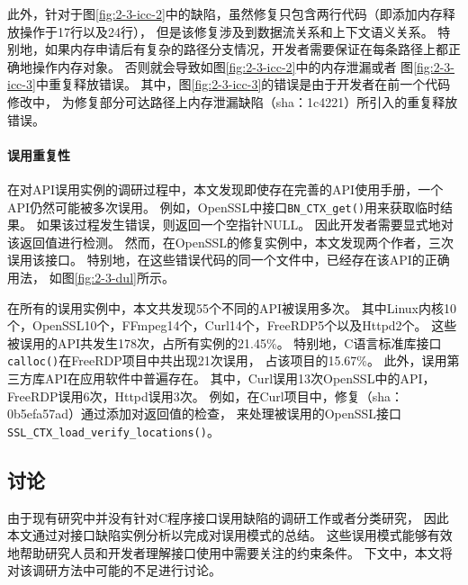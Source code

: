 此外，针对于图\ref{fig:2-3-icc-2}中的缺陷，虽然修复只包含两行代码（即添加内存释放操作于17行以及24行），
但是该修复涉及到数据流关系和上下文语义关系。
特别地，如果内存申请后有复杂的路径分支情况，开发者需要保证在每条路径上都正确地操作内存对象。
否则就会导致如图\ref{fig:2-3-icc-2}中的内存泄漏或者
图\ref{fig:2-3-icc-3}中重复释放错误。
其中，图\ref{fig:2-3-icc-3}的错误是由于开发者在前一个代码修改中，
为修复部分可达路径上内存泄漏缺陷（sha：1c4221）所引入的重复释放错误。

\vspace*{10pt}
\begin{center}
	\noindent{}
\end{center}



\paragraph{误用重复性}
在对API误用实例的调研过程中，本文发现即使存在完善的API使用手册，一个API仍然可能被多次误用。
例如，OpenSSL中接口\texttt{BN\_CTX\_get()}用来获取临时结果。
如果该过程发生错误，则返回一个空指针NULL。
因此开发者需要显式地对该返回值进行检测。
然而，在OpenSSL的修复实例中，本文发现两个作者，三次误用该接口。
特别地，在这些错误代码的同一个文件中，已经存在该API的正确用法，
如图\ref{fig:2-3-dul}所示。

在所有的误用实例中，本文共发现55个不同的API被误用多次。
其中Linux内核10个，OpenSSL10个，FFmpeg14个，Curl14个，FreeRDP5个以及Httpd2个。
这些被误用的API共发生178次，占所有实例的21.45\%。
特别地，C语言标准库接口\texttt{calloc()}在FreeRDP项目中共出现21次误用，
占该项目的15.67\%。
此外，误用第三方库API在应用软件中普遍存在。
其中，Curl误用13次OpenSSL中的API，FreeRDP误用6次，Httpd误用3次。
例如，在Curl项目中，修复（sha：0b5efa57ad）通过添加对返回值的检查，
来处理被误用的OpenSSL接口
\texttt{SSL\_CTX\_load\_verify\_locations()}。


\subsection{讨论}
由于现有研究中并没有针对C程序接口误用缺陷的调研工作或者分类研究，
因此本文通过对接口缺陷实例分析以完成对误用模式的总结。
这些误用模式能够有效地帮助研究人员和开发者理解接口使用中需要关注的约束条件。
下文中，本文将对该调研方法中可能的不足进行讨论。

